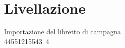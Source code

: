 \chapter{Livellazione}
\label{misc:cap2}
Importazione del libretto di campagna\\
\si{44551215543.4}{\meter\squared}

